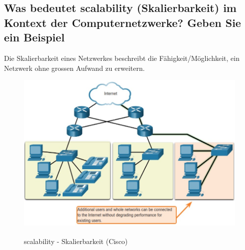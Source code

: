\subsection*{Was bedeutet \flqq scalability\frqq{} (Skalierbarkeit) im Kontext der Computernetzwerke? Geben Sie ein Beispiel}\label{sub:NetworkScalability}
Die Skalierbarkeit eines Netzwerkes beschreibt die Fähigkeit/Möglichkeit, ein Netzwerk ohne grossen Aufwand zu erweitern.
\begin{figure}[H]
    \begin{center}
    \label{pic:scalability}
    \includegraphics[width=\textwidth]{images/scalability.jpg}
    \caption{scalability - Skalierbarkeit (\textsuperscript{\textcopyright}Cisco)}
    \end{center}
\end{figure}

